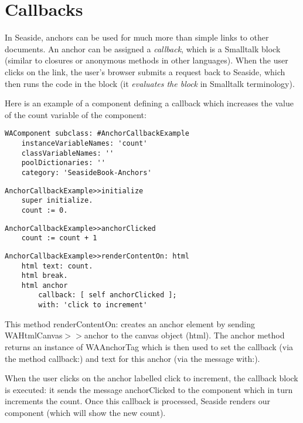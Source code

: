 \documentclass[a4paper,10pt,twoside]{book}
\newcommand{\ct}[1]{{\small\ttfamily\textup{#1}}}
\begin{document}
\section{Callbacks}
\label{book:fundamentals:anchors:callbacks}

In Seaside, anchors can be used for much more than simple links to other documents. An anchor can be assigned a \textit{callback}, which is a Smalltalk block (similar to closures or anonymous methods in other languages). When the user clicks on the link, the user's browser submits a request back to Seaside, which then runs the code in the block (it \textit{evaluates the block} in Smalltalk terminology). 

Here is an example of a component defining a callback which increases the value of the \ct{count} variable of the component:

\begin{lstlisting}
WAComponent subclass: #AnchorCallbackExample
    instanceVariableNames: 'count'
    classVariableNames: ''
    poolDictionaries: ''
    category: 'SeasideBook-Anchors'
\end{lstlisting}

\begin{lstlisting}
AnchorCallbackExample>>initialize
    super initialize.
    count := 0.
\end{lstlisting}

\begin{lstlisting}
AnchorCallbackExample>>anchorClicked
    count := count + 1
\end{lstlisting}

\begin{lstlisting}
AnchorCallbackExample>>renderContentOn: html
    html text: count.
    html break.
    html anchor
        callback: [ self anchorClicked ];
        with: 'click to increment'
\end{lstlisting}

This method \ct{renderContentOn:} creates an anchor element by sending
 \ct{WAHtmlCanvas$>$$>$anchor} to the canvas object (\ct{html}). The \ct{anchor} method returns an instance of  \ct{WAAnchorTag} which is then used to set the callback (via the method \ct{callback:}) and text for this anchor (via the
message \ct{with:}).

When the user clicks on the anchor labelled click to increment, the callback block is executed: it sends the message \ct{anchorClicked} to the component which in turn increments the count. Once this callback is processed, Seaside renders our component (which will show the new count). 
\end{document}
